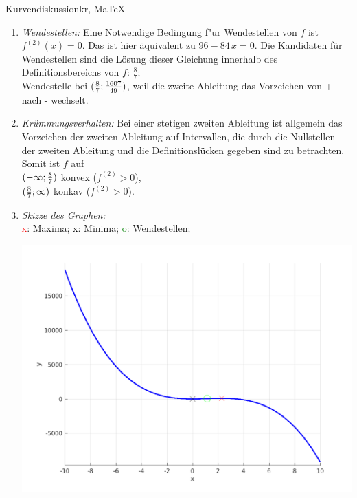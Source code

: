 \begin{MAufgabe}{Kurvendiskussion}{kr, MaTeX}
\begin{enumerate}
 $\MoIl-\infty\MIntvlSep0\MoIr$ monoton fallend, \\ 
 $\MoIl0\MIntvlSep\frac{16}{7}\MoIr$ monoton  wachsend, \\ 
 $\MoIl\frac{16}{7}\MIntvlSep \infty\MoIr$ monoton fallend. \\ 
 \item \emph{Wendestellen:} 
 Eine Notwendige Bedingung f"ur Wendestellen von $f$ ist $f^{(2)}(x)=0$. 
 Das ist hier \"aquivalent zu $96 - 84\, x=0$. 
 Die Kandidaten f\"ur Wendestellen sind die L\"osung dieser Gleichung innerhalb des Definitionsbereichs von $f$: $\frac{8}{7}$; \\ 
 Wendestelle bei $(\frac{8}{7};\frac{1607}{49})$, weil die zweite Ableitung das Vorzeichen von + nach - wechselt. \\ 
 \item \emph{Kr\"ummungsverhalten:} 
 Bei einer stetigen zweiten Ableitung ist allgemein das Vorzeichen der zweiten Ableitung auf Intervallen, die durch die Nullstellen der zweiten Ableitung und die Definitionsl\"ucken gegeben sind zu betrachten. 
 Somit ist $f$ auf \\ 
 $(-\infty ;\frac{8}{7})$  konvex ($f^{(2)}>0$), \\ 
 $(\frac{8}{7}; \infty)$  konkav ($f^{(2)}>0$). \\ 
 \item \emph{Skizze des Graphen:} \\ 
 {\textcolor{red} x}: Maxima; {\textcolor{black} x}: Minima; {\textcolor{green} o}: Wendestellen; 
  \begin{center}
  \includegraphics[width=0.8\linewidth]{Abb_zur_Ag_autogenerated_fractions_50.png} \end{center}
  
 \end{enumerate}
 \else\relax\fi
  \end{MAufgabe}